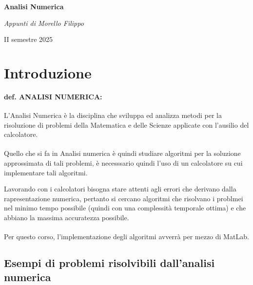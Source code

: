 \documentclass[a4paper, 11pt]{article}
\begin{document}
    \begin{titlepage}
        \centering
    
        \vspace{2cm}
        {\Huge\bfseries Analisi Numerica\par}
    
        \vspace{1cm}
        {\Large\itshape Appunti di Morello Filippo\par}
    
        \vfill
        {\large II semestre 2025\par}
    
    \end{titlepage}

    \tableofcontents

    \break
    
    \section{Introduzione}
        \paragraph{def. ANALISI NUMERICA: }
        L'Analisi Numerica è la disciplina che sviluppa ed analizza metodi per la risoluzione di problemi della Matematica e delle Scienze applicate con l'ausilio del calcolatore. 
        \paragraph{}
        Quello che si fa in Analisi numerica è quindi studiare algoritmi per la soluzione approssimata di tali problemi, è necesssario quindi l'uso di un calcolatore su cui implementare tali algoritmi.

        Lavorando con i calcolatori bisogna stare attenti agli errori che derivano dalla rapresentazione numerica, pertanto si cercano algoritmi che risolvano i problmei nel minimo tempo possibile (quindi con una complessità temporale ottima) e che abbiano la massima accuratezza possibile.

        \paragraph{}
        Per questo corso, l'implementazione degli algoritmi avverrà per mezzo di MatLab.

        \subsection*{Esempi di problemi risolvibili dall'analisi numerica}
\end{document}
